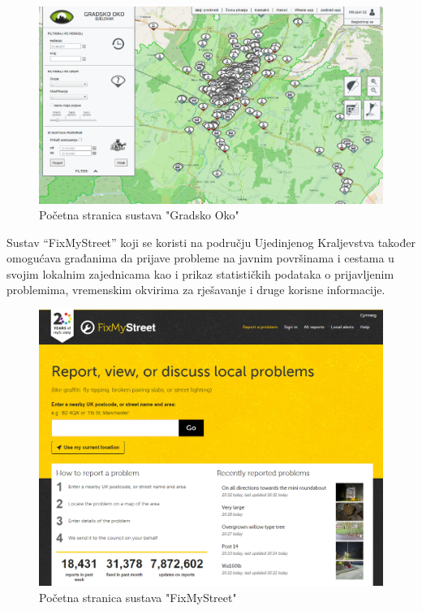 \begin{figure}[H]
	\includegraphics[scale=0.5]{slike/GradskoOko.png} %
	\centering
	\caption{Početna stranica sustava "Gradsko Oko"}
	\label{fig:GradskoOkoPrimjer}
\end{figure}

\newpage

\noindent Sustav “FixMyStreet” koji se koristi na području Ujedinjenog Kraljevstva također omogućava građanima da prijave probleme na javnim površinama i cestama u svojim lokalnim zajednicama kao i prikaz statističkih podataka o prijavljenim problemima, vremenskim okvirima za rješavanje i druge korisne informacije.

\begin{figure}[H]
	\includegraphics[scale=0.4]{slike/FixMyStreet.png} %
	\centering
	\caption{Početna stranica sustava "FixMyStreet"}
	\label{fig:FixMyStreet}
\end{figure}

